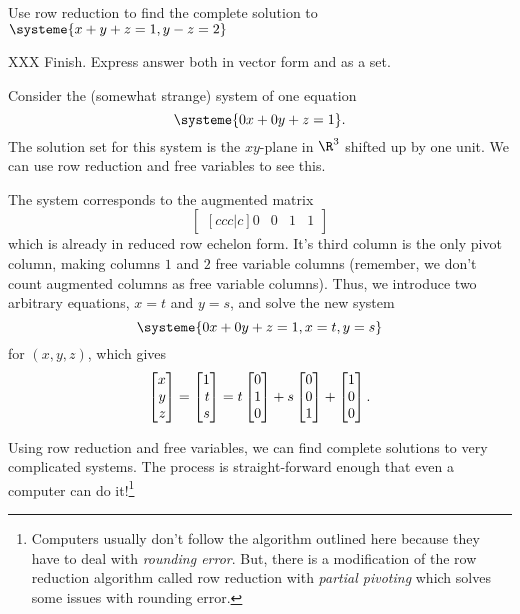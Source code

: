 	\begin{example}
		Use row reduction to find the complete solution to $\systeme{x+y+z=1,y-z=2}$
	
		XXX Finish. Express answer both in vector form and as a set.
	\end{example}


	\medskip
	Consider the (somewhat strange) system of one equation
	\[
		\systeme{0x+0y+z=1}.
	\]
	The solution set for this system is the $xy$-plane in $\R^3$ shifted up by one unit. We can
	use row reduction and free variables to see this.

	The system corresponds to the augmented matrix
	\[
		\begin{bmatrix}[ccc|c]
			0&0&1&1
		\end{bmatrix}
	\]
	which is already in reduced row echelon form. It's third column is the only pivot column, making columns $1$ and $2$
	free variable columns (remember, we don't count augmented columns as free variable columns). 
	Thus, we introduce two arbitrary equations, $x=t$ and $y=s$, and solve the new system
	\[
		\systeme{0x+0y+z=1,x=t,y=s}
	\]
	for $(x,y,z)$, which gives
	\[
		\mat{x\\y\\z}= \mat{1\\t\\s} = t\mat{0\\1\\0}+s\mat{0\\0\\1}+\mat{1\\0\\0}.
	\]

	\medskip
	Using row reduction and free variables, we can find complete solutions to very complicated systems.
	The process is straight-forward enough that even a computer can do it!\footnote{
		Computers usually don't follow the algorithm outlined here because they have
		to deal with \emph{rounding error}. But, there is a modification of the row
		reduction algorithm called row reduction with \emph{partial pivoting} which
		solves some issues with rounding error.
	}


